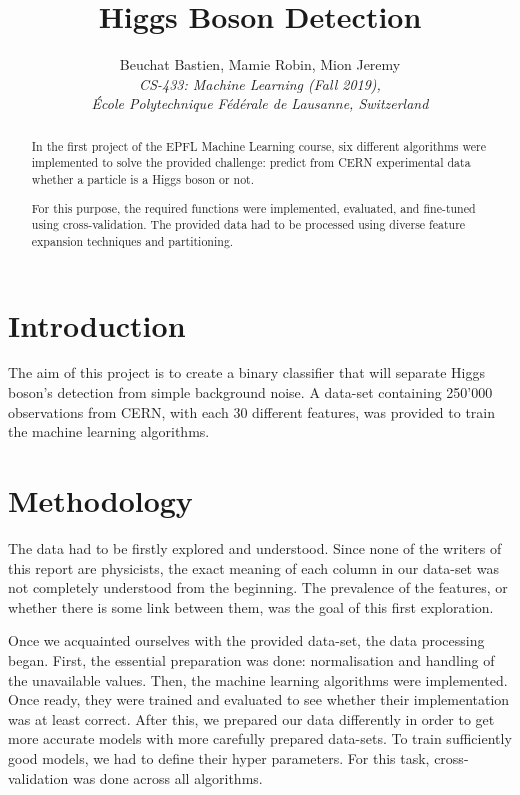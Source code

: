 \documentclass[10pt,conference,compsocconf]{IEEEtran}
\begin{document}
\title{Higgs Boson Detection}

\author{
  Beuchat Bastien, Mamie Robin, Mion Jeremy\\
  \textit{CS-433: Machine Learning (Fall 2019),}\\
   \textit{École Polytechnique Fédérale de Lausanne, Switzerland}
}

\maketitle

\begin{abstract}
In the first project of the EPFL Machine Learning course, six different algorithms were implemented to solve the provided challenge: predict from CERN experimental data whether a particle is a Higgs boson or not.

For this purpose, the required functions were implemented, evaluated, and fine-tuned using cross-validation.
The provided data had to be processed using diverse feature expansion techniques and partitioning.
\end{abstract}


\section{Introduction}

The aim of this project is to create a binary classifier that will separate Higgs boson's detection from simple background noise.
A data-set containing 250'000 observations from CERN, with each 30 different features, was provided to train the machine learning algorithms.


\section{Methodology}

The data had to be firstly explored and understood.
Since none of the writers of this report are physicists, the exact meaning of each column in our data-set was not completely understood from the beginning.
The prevalence of the features, or whether there is some link between them, was the goal of this first exploration.

Once we acquainted ourselves with the provided data-set, the data processing began.
First, the essential preparation was done: normalisation and handling of the unavailable values.
Then, the machine learning algorithms were implemented.
Once ready, they were trained and evaluated to see whether their implementation was at least correct.
After this, we prepared our data differently in order to get more accurate models with more carefully prepared data-sets.
To train sufficiently good models, we had to define their hyper parameters.
For this task, cross-validation was done across all algorithms.
\end{document}
